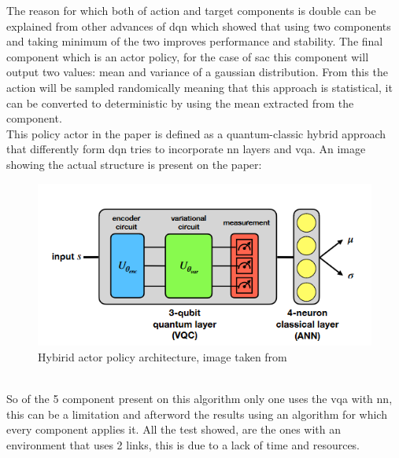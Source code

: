 The reason for which both of action and target components is double can be explained from other advances of \acrshort{dqn} which showed that using two components and taking minimum of the two improves performance and stability.
The final component which is an actor policy, for the case of \acrshort{sac} this component will output two values: mean and variance of a gaussian distribution. From this the action will be sampled randomically meaning that this approach is statistical, it can be converted to deterministic by using the mean extracted from the component.\\
This policy actor in the paper is defined as a quantum-classic hybrid approach that differently form \acrshort{dqn} tries to incorporate \acrlong{nn} layers and \acrlong{vqa}. An image showing the actual structure is present on the paper:
\begin{figure}[h]
	\centering
	\includegraphics[width=0.6\linewidth]{img/qsac}
	\caption{Hybirid actor policy architecture, image taken from \cite{https://doi.org/10.48550/arxiv.2112.11921}}
	\label{fig:qsac}
\end{figure}\\
So of the 5 component present on this algorithm only one uses the \acrshort{vqa} with \acrshort{nn}, this can be a limitation and afterword the results using an algorithm for which every component applies it. All the test showed, are the ones with an environment that uses 2 links, this is due to a lack of time and resources. 
